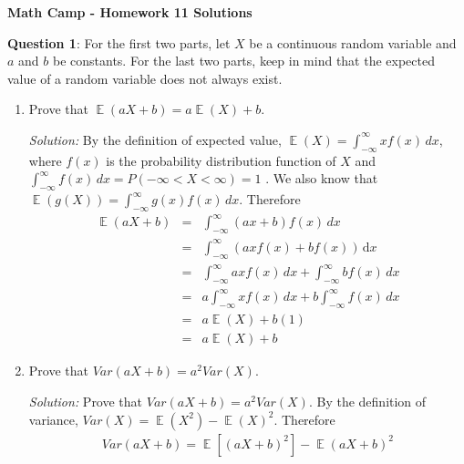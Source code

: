 \documentclass[11pt]{article}
\DeclareMathOperator*{\E}{\mathbb{E}}
\begin{document}
\centerline{\bf Math Camp - Homework 11 Solutions}



\noindent \textbf{Question 1}: For the first two parts, let  $X$ be a continuous random variable and $a$ and $b$ be constants. For the last two parts, keep in mind that the expected value of a random variable does not always exist.
\medskip
\begin{enumerate}
\item Prove that $\E(aX+b) = a\E(X)+b$.

{\it Solution:} By the definition of expected value, $\E(X) = \int_{-\infty}^{\infty} \! xf(x) \, dx$, where $f(x)$ is the probability distribution function of $X$ and $\int_{-\infty}^{\infty} \! f(x) \, dx = P(-\infty < X < \infty) = 1$ . We also know that $\E(g(X)) =  \int_{-\infty}^{\infty} \! g(x)f(x) \, dx$. Therefore
\begin{eqnarray*}
\E(aX+b) &=& \int_{-\infty}^{\infty} \! (ax+b)f(x) \, dx \\
&=& \int_{-\infty}^{\infty} \! (axf(x)+bf(x)) \, \mathrm{d} x \\
&=& \int_{-\infty}^{\infty} \! axf(x) \, dx + \int_{-\infty}^{\infty} \! bf(x) \, dx \\
&=& a \! \int_{-\infty}^{\infty} \! xf(x) \, dx + b \! \int_{-\infty}^{\infty} \! f(x) \, dx \\
&=& a\E(X) + b(1) \\
&=& a\E(X) + b 
\end{eqnarray*}

\medskip
\item Prove that $Var(aX+b) = a^2 Var(X)$.

{\it Solution:} Prove that $Var(aX+b) = a^2Var(X)$.
\medskip
 By the definition of variance, $Var(X) = \E(X^2) - \E(X)^2$. Therefore
\begin{eqnarray*}
Var(aX+b) = \E[(aX+b)^2] - \E(aX+b)^2 
\end{eqnarray*}


\end{enumerate}
\end{document}
